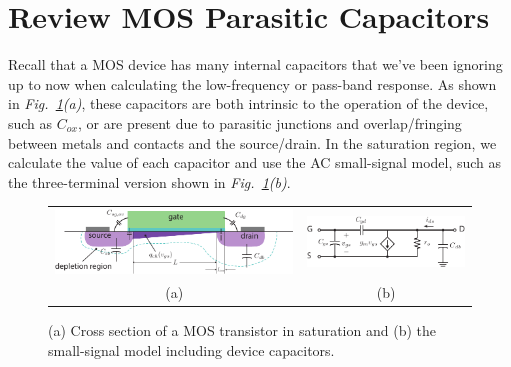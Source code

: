 \section{Review MOS Parasitic Capacitors}
Recall that a MOS device has many internal capacitors that we've been ignoring up to now when calculating the low-frequency or pass-band response.  As shown in \emph{Fig.~\ref{fig:mos_caps_xsect}(a)}, these capacitors are both intrinsic to the operation of the device, such as $C_{ox}$, or are present due to parasitic junctions and overlap/fringing between metals and contacts and the source/drain.  In the saturation region, we calculate the value of each capacitor and use the AC small-signal model, such as the three-terminal version shown in \emph{Fig.~\ref{fig:mos_caps_xsect}(b)}.
\begin{figure}[tb]
\centering
\begin{tabular}{cc}
\includegraphics[width=.45\columnwidth]{mos_caps_xsect} &
\includegraphics[width=.45\columnwidth]{mos3term_ac.pdf}\\
(a) & (b)\\
\end{tabular}
\caption{(a) Cross section of a MOS transistor in saturation and (b) the small-signal model including device capacitors.}
\label{fig:mos_caps_xsect}
\end{figure}
